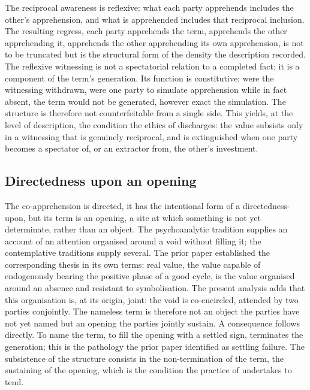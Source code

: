 The reciprocal awareness is reflexive: what each party apprehends includes the other's apprehension, and what is apprehended includes that reciprocal inclusion. The resulting regress, each party apprehends the term, apprehends the other apprehending it, apprehends the other apprehending its own apprehension, is not to be truncated but is the structural form of the density the description recorded. The reflexive witnessing is not a spectatorial relation to a completed fact; it is a component of the term's generation. Its function is constitutive: were the witnessing withdrawn, were one party to simulate apprehension while in fact absent, the term would not be generated, however exact the simulation. The structure is therefore not counterfeitable from a single side. This yields, at the level of description, the condition the ethics of  discharges: the value subsists only in a witnessing that is genuinely reciprocal, and is extinguished when one party becomes a spectator of, or an extractor from, the other's investment.

\subsection{Directedness upon an opening}
\label{p10:sec:opening}

The co-apprehension is directed, it has the intentional form of a directedness-upon, but its term is an opening, a site at which something is not yet determinate, rather than an object. The psychoanalytic tradition supplies an account of an attention organised around a void without filling it; the contemplative traditions supply several. The prior paper established the corresponding thesis in its own terms: real value, the value capable of endogenously bearing the positive phase of a good cycle, is the value organised around an absence and resistant to symbolisation. The present analysis adds that this organisation is, at its origin, joint: the void is co-encircled, attended by two parties conjointly. The nameless term is therefore not an object the parties have not yet named but an opening the parties jointly sustain. A consequence follows directly. To name the term, to fill the opening with a settled sign, terminates the generation; this is the pathology the prior paper identified as settling failure. The subsistence of the structure consists in the non-termination of the term, the sustaining of the opening, which is the condition the practice of  undertakes to tend.

